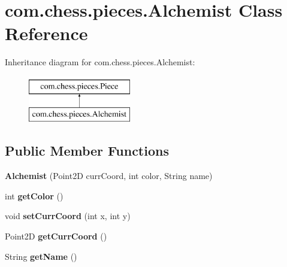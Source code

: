 \hypertarget{classcom_1_1chess_1_1pieces_1_1_alchemist}{}\section{com.\+chess.\+pieces.\+Alchemist Class Reference}
\label{classcom_1_1chess_1_1pieces_1_1_alchemist}
Inheritance diagram for com.\+chess.\+pieces.\+Alchemist\+:\begin{figure}[H]
\begin{center}
\leavevmode
\includegraphics[height=2.000000cm]{classcom_1_1chess_1_1pieces_1_1_alchemist}
\end{center}
\end{figure}
\subsection*{Public Member Functions}
\begin{DoxyCompactItemize}
\item 
\mbox{\label{classcom_1_1chess_1_1pieces_1_1_alchemist_a5f3a6bbf3ca2427333f1dcaf8d17e94f}} 
{\bfseries Alchemist} (Point2D curr\+Coord, int color, String name)
\item 
\mbox{\label{classcom_1_1chess_1_1pieces_1_1_alchemist_a3ea6f0604e9affb1992bcb35b7d6a472}} 
int {\bfseries get\+Color} ()
\item 
\mbox{\label{classcom_1_1chess_1_1pieces_1_1_alchemist_ac59ca9c54f6e726bdf2545b86458b776}} 
void {\bfseries set\+Curr\+Coord} (int x, int y)
\item 
\mbox{\label{classcom_1_1chess_1_1pieces_1_1_alchemist_aff58871badaa5fb524289eaebe8df374}} 
Point2D {\bfseries get\+Curr\+Coord} ()
\item 
\mbox{\label{classcom_1_1chess_1_1pieces_1_1_alchemist_ab7cf0ed7a4e0b9e0dfeeccac33fe59fc}} 
String {\bfseries get\+Name} ()
\end{DoxyCompactItemize}



